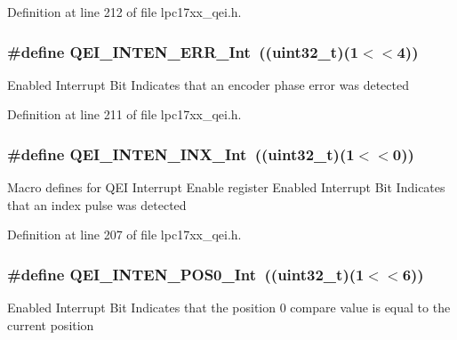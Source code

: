 \-Definition at line 212 of file lpc17xx\-\_\-qei.\-h.

\hypertarget{group___q_e_i___private___macros_ga53ae756bf83ad4e807e25b5d7bafbdde}{
\subsubsection[{\-Q\-E\-I\-\_\-\-I\-N\-T\-E\-N\-\_\-\-E\-R\-R\-\_\-\-Int}]{\setlength{\rightskip}{0pt plus 5cm}\#define {\bf \-Q\-E\-I\-\_\-\-I\-N\-T\-E\-N\-\_\-\-E\-R\-R\-\_\-\-Int}~((uint32\-\_\-t)(1$<$$<$4))}}\label{group___q_e_i___private___macros_ga53ae756bf83ad4e807e25b5d7bafbdde}
\-Enabled \-Interrupt \-Bit \-Indicates that an encoder phase error was detected 

\-Definition at line 211 of file lpc17xx\-\_\-qei.\-h.

\hypertarget{group___q_e_i___private___macros_gaa79897648d64d3640a5f4ec54774e449}{
\subsubsection[{\-Q\-E\-I\-\_\-\-I\-N\-T\-E\-N\-\_\-\-I\-N\-X\-\_\-\-Int}]{\setlength{\rightskip}{0pt plus 5cm}\#define {\bf \-Q\-E\-I\-\_\-\-I\-N\-T\-E\-N\-\_\-\-I\-N\-X\-\_\-\-Int}~((uint32\-\_\-t)(1$<$$<$0))}}\label{group___q_e_i___private___macros_gaa79897648d64d3640a5f4ec54774e449}
\-Macro defines for \-Q\-E\-I \-Interrupt \-Enable register \-Enabled \-Interrupt \-Bit \-Indicates that an index pulse was detected 

\-Definition at line 207 of file lpc17xx\-\_\-qei.\-h.

\hypertarget{group___q_e_i___private___macros_gabf41194c2caaf0552f9a84dff8341711}{
\subsubsection[{\-Q\-E\-I\-\_\-\-I\-N\-T\-E\-N\-\_\-\-P\-O\-S0\-\_\-\-Int}]{\setlength{\rightskip}{0pt plus 5cm}\#define {\bf \-Q\-E\-I\-\_\-\-I\-N\-T\-E\-N\-\_\-\-P\-O\-S0\-\_\-\-Int}~((uint32\-\_\-t)(1$<$$<$6))}}\label{group___q_e_i___private___macros_gabf41194c2caaf0552f9a84dff8341711}
\-Enabled \-Interrupt \-Bit \-Indicates that the position 0 compare value is equal to the current position 

